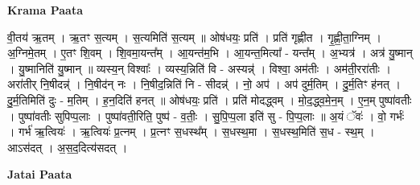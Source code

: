 \documentclass[17pt]{extarticle}
\begin{document}
\textbf{Krama Paata} \newline

वी॒तय॑ ऋ॒तम् । ऋ॒तꣳ स॒त्यम् । स॒त्यमिति॑ स॒त्यम् ॥ ओष॑धयः॒ प्रति॑ । प्रति॑ गृह्णीत । गृ॒ह्णी॒ता॒ग्निम् । अ॒ग्निमे॒तम् । ए॒तꣳ शि॒वम् । शि॒वमा॒यन्त᳚म् । आ॒यन्त॑म॒भि । आ॒यन्त॒मित्या᳚ - यन्त᳚म् । अ॒भ्यत्र॑ । अत्र॑ यु॒ष्मान् । यु॒ष्मानिति॑ यु॒ष्मान् ॥ व्यस्य॒न् विश्वाः᳚ । व्यस्य॒न्निति॑ वि - अस्यन्न्॑ । विश्वा॒ अम॑तीः । अम॑ती॒ररा॑तीः । अरा॑तीर् नि॒षीदन्न्॑ । नि॒षीद॑न् नः । नि॒षीद॒न्निति॑ नि - सीदन्न्॑ । नो॒ अप॑ । अप॑ दुर्म॒तिम् । दु॒र्म॒तिꣳ ह॑नत् । दु॒र्म॒तिमिति॑ दुः - म॒तिम् । ह॒न॒दिति॑ हनत् ॥ ओष॑धयः॒ प्रति॑ । प्रति॑ मोदद्ध्वम् । मो॒द॒द्ध्व॒मे॒न॒म् । ए॒न॒म् पुष्पा॑वतीः । पुष्पा॑वतीः सुपिप्प॒लाः । पुष्पा॑वती॒रिति॒ पुष्प॑ - व॒तीः॒ । सु॒पि॒प्प॒ला इति॑ सु - पि॒प्प॒लाः ॥ अ॒यं ॅवः॑ । वो॒ गर्भः॑ । गर्भ॑ ऋ॒त्वियः॑ । ऋ॒त्वियः॑ प्र॒त्नम् । प्र॒त्नꣳ स॒धस्थ᳚म् । स॒धस्थ॒मा । स॒धस्थ॒मिति॑ स॒ध - स्थ॒म् । आऽस॑दत् । अ॒स॒द॒दित्य॑सदत् । \newline

\textbf{Jatai Paata} \newline
\end{document}
